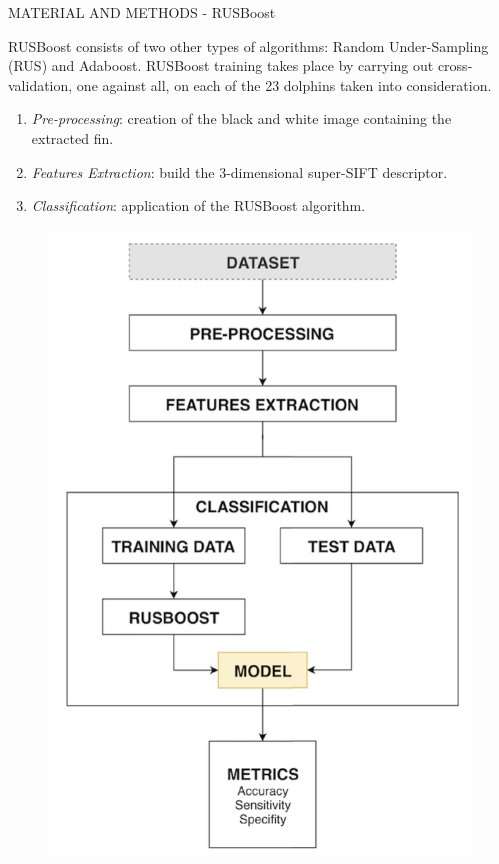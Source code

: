 \begin{frame}{MATERIAL AND METHODS - RUSBoost}
    \begin{minipage}{\linewidth}
        \centering
        \begin{minipage}{0.47\linewidth}
            RUSBoost consists of two other types of algorithms: Random Under-Sampling 
            (RUS) and Adaboost. RUSBoost training takes place by carrying out 
            cross-validation, one against all, on each of the 23 dolphins taken into consideration.
            \begin{enumerate}
                \item \emph{Pre-processing}: creation of the black and white image containing the 
                extracted fin.
                \item \emph{Features Extraction}: build the 3-dimensional super-SIFT descriptor. 
                \item \emph{Classification}: application of the RUSBoost algorithm.
            \end{enumerate}  
        \end{minipage}
        \hspace{0.05\linewidth}
        \begin{minipage}{0.45\linewidth}
            \begin{figure}[h!]
                \centering
                \includegraphics[width =\linewidth]{images/paper10/RUSBoost model.png}

\end{figure}
\end{minipage}
\end{minipage}
\end{frame}
